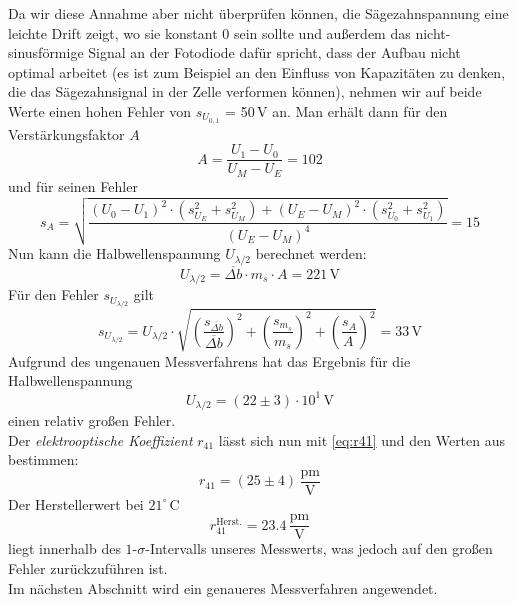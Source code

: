 Da wir diese Annahme aber nicht überprüfen können,
die Sägezahnspannung eine leichte Drift zeigt, wo sie konstant 0 sein sollte
und außerdem das nicht-sinusförmige
Signal an der Fotodiode dafür spricht, dass der Aufbau nicht optimal arbeitet
(es ist zum Beispiel an den Einfluss von Kapazitäten zu denken,
die das Sägezahnsignal in der Zelle verformen können),
nehmen wir auf beide Werte einen hohen Fehler von $s_{U_{0,1}}$ = 50\,V an.
Man erhält dann für den Verstärkungsfaktor $A$
\begin{equation}
  A=\frac{U_1-U_0}{U_M-U_E}=102
\end{equation}
und für seinen Fehler
\begin{equation}
  s_A=\sqrt{\frac{(U_0-U_1)^2 \cdot \left(s_{U_E}^2+s_{U_M}^2\right)+(U_E-U_M)^2 \cdot \left(s_{U_0}^2+s_{U_1}^2\right)}{(U_E-U_M)^4}}
  =15
\end{equation}
Nun kann die Halbwellenspannung $U_{\lambda / 2}$ berechnet werden:
\begin{equation}
  U_{\lambda / 2}  = \overline{\Delta b} \cdot m_s \cdot A = 221\,\text{V}
\end{equation}
Für den Fehler $s_{U_{\lambda / 2}}$ gilt
\begin{equation}
  s_{U_{\lambda / 2}} = U_{\lambda / 2} \cdot \sqrt{\left(\frac{s_{\overline{\Delta b}}}{\overline{\Delta b}}\right)^2+\left(\frac{s_{m_s}}{m_s}\right)^2+\left(\frac{s_{A}}{A_{\,}}\right)^2}
  = 33 \,\text{V}
\end{equation}
Aufgrund des ungenauen Messverfahrens hat das Ergebnis für die Halbwellenspannung
\begin{equation}
  U_{\lambda / 2}  = (22 \pm 3) \cdot 10^1\,\text{V}
\end{equation}
einen relativ großen Fehler. \\
Der \emph{elektrooptische Koeffizient} $r_{41}$ lässt sich nun mit \autoref{eq:r41} und den Werten aus \cite{manual} bestimmen:
\begin{equation}
  r_{41} = (25 \pm 4)\, \frac{\text{pm}}{\text{V}}
\end{equation}
Der Herstellerwert bei $21^\circ\,$C 
\begin{equation}
  r_{41}^{\text{Herst.}} = 23.4 \, \frac{\text{pm}}{\text{V}}
\end{equation} 
liegt innerhalb des $1$-$\sigma$-Intervalls unseres Messwerts, was jedoch auf den großen Fehler zurückzuführen ist.\\
Im nächsten Abschnitt wird ein genaueres Messverfahren angewendet.
